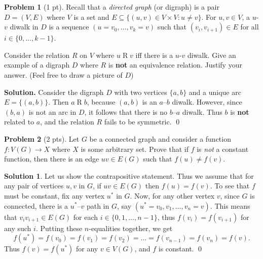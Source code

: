 \documentclass[11pt]{scrartcl}
\theoremstyle{definition}
\newtheorem{problem}{Problem}
\newtheorem{Solution}{Solution}
\newenvironment{solution}{\noindent\textbf{Solution.}}{\qed}
\begin{document}

\begin{problem}[1 pt]
	Recall that a \emph{directed graph} (or digraph) is a pair $D=(V,E)$ where $V$ is a set and $E\subseteq \{(u,v) \in V\times V \colon u\ne v\}$.
	For $u,v\in V$, a $u$-$v$ diwalk in $D$ is a sequence $(u=v_0,\dots,v_k=v)$ such that $(v_i,v_{i+1})\in E$ for all $i\in\{0,\dots,k-1\}$.
	
	Consider the relation $R$ on $V$ where $u\mathbin R v$ iff there is a $u$-$v$ diwalk.
	Give an example of a digraph $D$ where $R$ is \textbf{not} an equivalence relation.
	Justify your answer.
	(Feel free to draw a picture of $D$)
\end{problem}
\begin{solution}
Consider the digraph $D$ with two vertices $\{a, b\}$ and a unique arc $E=\{(a,b)\}$. Then $a\mathbin R b$, because $(a,b)$ is an $a$--$b$ diwalk. However, since $(b,a)$ is not an arc in $D$, it follows that there is no $b$--$a$ diwalk. Thus $b$ is \textbf{not} related to $a$, and the relation $R$ fails to be symmetric.
\end{solution}

\hrulefill

\begin{problem}[2 pts]
	Let $G$ be a connected graph and consider a function $f\colon V(G)\to X$ where $X$ is some arbitrary set.
	Prove that if $f$ is \emph{not} a constant function, then there is an edge $uv\in E(G)$ such that $f(u)\neq f(v)$.
\end{problem}

\begin{Solution}
Let us show the contrapositive statement. Thus we assume that for any pair of vertices $u, v$ in $G$, if $uv\in E(G)$ then $f(u)=f(v)$. To see that $f$ must be constant, fix any vertex $u^*$ in $G$. Now, for any other vertex $v$, since $G$ is connected, there is a $u^*$--$v$ path in $G$, say $(u^*=v_0, v_1, \dots, v_n=v)$. This means that $v_i v_{i+1} \in E(G)$ for each $i\in\{0, 1, \dots, n-1\}$, thus $f(v_i)=f(v_{i+1})$ for any such $i$. Putting these $n$-equalities together, we get
\[f(u^*)=f(v_0)=f(v_1)=f(v_2)=\dots=f(v_{n-1})=f(v_n)=f(v).\] 
Thus $f(v)=f(u^*)$ for any $v\in V(G)$, and $f$ is constant. \qed
\end{Solution}
\end{document}
